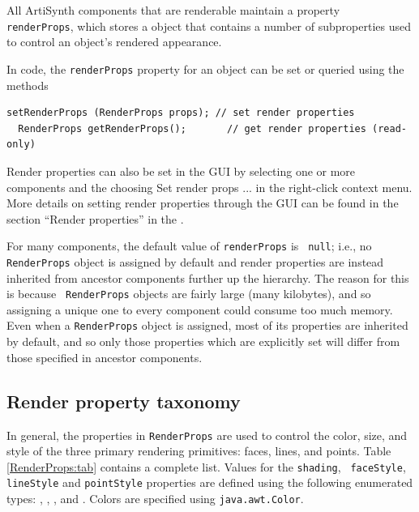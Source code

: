 All ArtiSynth components that are renderable maintain a property {\tt
renderProps}, which stores a
 object that contains a number
of subproperties used to control an object's rendered appearance.

In code, the {\tt renderProps} property for an object can be set or
queried using the methods
\begin{lstlisting}[]
  setRenderProps (RenderProps props); // set render properties
  RenderProps getRenderProps();       // get render properties (read-only)
\end{lstlisting}
%
Render properties can also be set in the GUI by selecting one or more
components and the choosing {\sf Set render props ...}  in the
right-click context menu. More details on setting render properties
through the GUI can be found in the section ``Render properties'' in the
.

For many components, the default value of {\tt renderProps} is {\tt
null}; i.e., no {\tt RenderProps} object is assigned by default and
render properties are instead inherited from ancestor components
further up the hierarchy. The reason for this is because {\tt
RenderProps} objects are fairly large (many kilobytes), and so
assigning a unique one to every component could consume too much
memory. Even when a {\tt RenderProps} object is assigned, most of its
properties are inherited by default, and so only those properties
which are explicitly set will differ from those specified in ancestor
components.

\subsection{Render property taxonomy}

In general, the properties in {\tt RenderProps} are used to control
the color, size, and style of the three primary rendering
primitives: faces, lines, and points. Table \ref{RenderProps:tab}
contains a complete list. Values for the {\tt shading}, {\tt
faceStyle}, {\tt lineStyle} and {\tt pointStyle} properties are
defined using the following enumerated types:
, 
, 
, 
and 
.
Colors are specified using {\tt java.awt.Color}.

